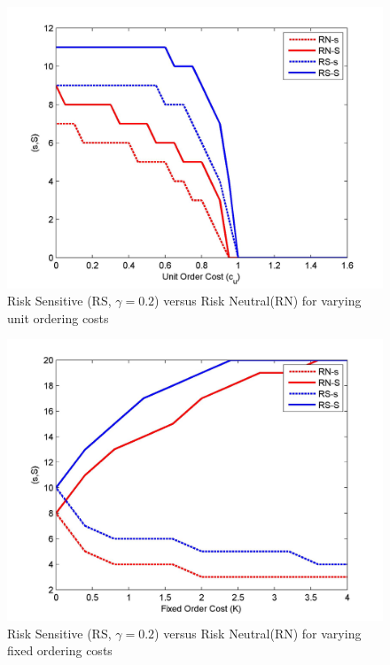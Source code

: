 \documentclass[11pt,a4paper,oneside]{report}
\begin{document}
\begin{figure}[H]
\centering
\includegraphics[scale=0.15]{RS0_2vsRNoc}
\caption{Risk Sensitive (RS, $\gamma = 0.2$) versus Risk Neutral(RN) for varying unit ordering costs}
\label{fig3}
\end{figure}

\begin{figure}[H]
\centering
\includegraphics[scale=0.15]{RS0_2vsRNfoc}
\caption{Risk Sensitive (RS, $\gamma = 0.2$) versus Risk Neutral(RN) for varying fixed ordering costs}
\label{fig4}
\end{figure}
\end{document}
